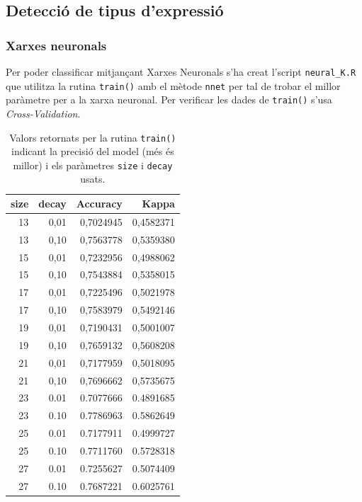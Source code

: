 \documentclass[a4paper]{article}
\begin{document}
\subsection{Detecció de tipus d'expressió}
\subsubsection{Xarxes neuronals}

Per poder classificar mitjançant Xarxes Neuronals s'ha creat l'script \verb|neural_K.R| que utilitza la rutina \verb|train()| amb el mètode \verb|nnet| per tal de trobar el millor paràmetre per a la xarxa neuronal. Per verificar les dades de \verb|train()| s'usa \emph{Cross-Validation}.

\begin{table}[H]
	\centering
	\def\arraystretch{1.2}
	\begin{tabular}{|rrrr|}
		\hline
		size & decay & Accuracy & Kappa \\
		\hline
		13 & 0,01 & 0,7024945 & 0,4582371 \\
		13 & 0,10 & 0,7563778 & 0,5359380 \\
		15 & 0,01 & 0,7232956 & 0,4988062 \\
		15 & 0,10 & 0,7543884 & 0,5358015 \\
		17 & 0,01 & 0,7225496 & 0,5021978 \\
		17 & 0,10 & 0,7583979 & 0,5492146 \\
		19 & 0,01 & 0,7190431 & 0,5001007 \\
		19 & 0,10 & 0,7659132 & 0,5608208 \\
		21 & 0,01 & 0,7177959 & 0,5018095 \\
		21 & 0,10 & 0,7696662 & 0,5735675 \\
		23 & 0.01 & 0.7077666 & 0.4891685 \\
		23 & 0.10 & 0.7786963 & 0.5862649 \\
		25 & 0.01 & 0.7177911 & 0.4999727 \\
		\rowcolor{Orange!40}
		25 & 0.10 & 0.7711760 & 0.5728318 \\
		27 & 0.01 & 0.7255627 & 0.5074409 \\
		27 & 0.10 & 0.7687221 & 0.6025761 \\
		\hline
	\end{tabular}
	\captionsetup{width=0.6\textwidth}
	\caption{Valors retornats per la rutina \texttt{train()} indicant la precisió del model (més és millor) i els paràmetres \texttt{size} i \texttt{decay} usats.}
	\label{tab:nnet_k}
\end{table}
\end{document}
